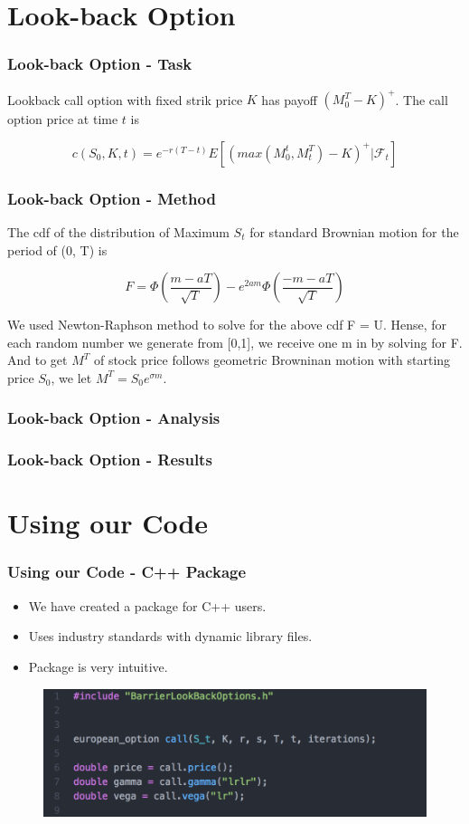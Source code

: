 \documentclass[12pt]{beamer}
\begin{document}
\section{Look-back Option}
\begin{frame}
\frametitle{Look-back Option - Task}
Lookback call option with fixed strik price $K$ has payoff $(M^T_{0}-K)^+$. The call option price at time $t$ is

$$c(S_0,K,t) = e^{-r(T-t)}E[(max(M^t_0,M^T_t)-K)^+|\mathcal{F}_t] $$


\end{frame}

\begin{frame}
\frametitle{Look-back Option - Method}
The cdf of the distribution of Maximum $S_t$ for standard Brownian motion for the period of (0, T) is 

$$F = \Phi(\frac{m-aT}{\sqrt{T}})-e^{2am}\Phi(\frac{-m-aT}{\sqrt{T}})$$

We used Newton-Raphson method to solve for the above cdf F = U. Hense, for each random number we generate from [0,1], we receive one m in by solving for F. And to get $M^T$ of stock price follows geometric Browninan motion with starting price $S_0$, we let $M^T=S_0e^{\sigma m }$.\\


\end{frame}

\begin{frame}
\frametitle{Look-back Option - Analysis}
\end{frame}

\begin{frame}
\frametitle{Look-back Option - Results}

\end{frame}


\section{Using our Code}
\begin{frame}
\frametitle{Using our Code - C++ Package}
\begin{itemize}
  \item We have created a package for C++ users.
  \item Uses industry standards with dynamic library files.
  \item Package is very intuitive.
\end{itemize}

\begin{figure}[h!]
  \centering
\includegraphics[width=\textwidth]{graphs/code_easy_demo.png}
\end{figure}
\end{frame}
\end{document}
